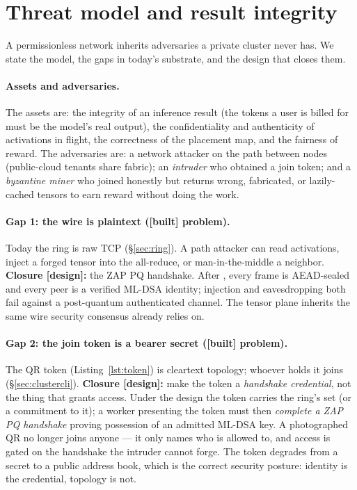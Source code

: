 \documentclass[11pt]{article}
\newcommand{\built}{\textcolor{str}{\small\textbf{[built]}}}
\newcommand{\design}{\textcolor{cmt}{\small\textbf{[design]}}}
\begin{document}
\section{Threat model and result integrity}
\label{sec:threat}

A permissionless network inherits adversaries a private cluster never has. We state the model,
the gaps in today's substrate, and the design that closes them.

\paragraph{Assets and adversaries.} The assets are: the integrity of an inference result (the
tokens a user is billed for must be the model's real output), the confidentiality and
authenticity of activations in flight, the correctness of the placement map, and the fairness of
reward. The adversaries are: a network attacker on the path between nodes (public-cloud tenants
share fabric); an \emph{intruder} who obtained a join token; and a \emph{byzantine miner} who
joined honestly but returns wrong, fabricated, or lazily-cached tensors to earn reward without
doing the work.

\paragraph{Gap 1: the wire is plaintext (\built{} problem).} Today the ring is raw TCP
(\S\ref{sec:ring}). A path attacker can read activations, inject a forged tensor into the
all-reduce, or man-in-the-middle a neighbor. \textbf{Closure \design{}:} the ZAP PQ handshake.
After , every frame is AEAD-sealed and every peer is a verified ML-DSA identity;
injection and eavesdropping both fail against a post-quantum authenticated channel. The tensor
plane inherits the same wire security consensus already relies on.

\paragraph{Gap 2: the join token is a bearer secret (\built{} problem).} The QR token
(Listing~\ref{lst:token}) is cleartext topology; whoever holds it joins (\S\ref{sec:clustercli}).
\textbf{Closure \design{}:} make the token a \emph{handshake credential}, not the thing that
grants access. Under the design the token carries the ring's  set (or a commitment
to it); a worker presenting the token must then \emph{complete a ZAP PQ handshake} proving
possession of an admitted ML-DSA key. A photographed QR no longer joins anyone --- it only names
who is allowed to, and access is gated on the handshake the intruder cannot forge. The token
degrades from a secret to a public address book, which is the correct security posture: identity
is the credential, topology is not.
\end{document}
